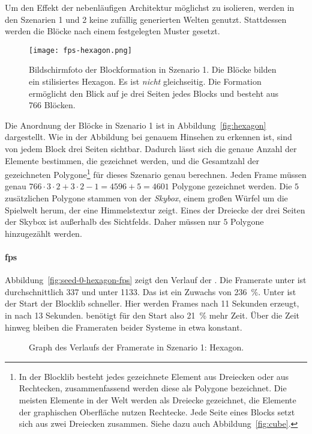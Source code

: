 
Um den Effekt der nebenläufigen Architektur möglichst zu isolieren, werden in den Szenarien 1 und 2 keine zufällig generierten Welten genutzt. Stattdessen werden die Blöcke nach einem festgelegten Muster gesetzt.

\begin{figure}
	\centering
	\texttt{[image: fps-hexagon.png]}
	\caption[Bildschirmfoto der Blockformation in Szenario 1 der Performanceanalyse.]{Bildschirmfoto der Blockformation in Szenario 1. Die Blöcke bilden ein stilisiertes Hexagon. Es ist \emph{nicht} gleichseitig. Die Formation ermöglicht den Blick auf je drei Seiten jedes Blocks und besteht aus 766 Blöcken.}\label{fig:hexagon}
\end{figure}
Die Anordnung der Blöcke in Szenario 1 ist in Abbildung~\vref{fig:hexagon} dargestellt. Wie in der Abbildung bei genauem Hinsehen zu erkennen ist, sind von jedem Block drei Seiten sichtbar. Dadurch lässt sich die genaue Anzahl der Elemente bestimmen, die gezeichnet werden, und die Gesamtzahl der gezeichneten Polygone\footnote{In der Blocklib besteht jedes gezeichnete Element aus Dreiecken oder aus Rechtecken, zusammenfassend werden diese als Polygone bezeichnet. Die meisten Elemente in der Welt werden als Dreiecke gezeichnet, die Elemente der graphischen Oberfläche nutzen Rechtecke. Jede Seite eines Blocks setzt sich aus zwei Dreiecken zusammen. Siehe dazu auch Abbildung~\vref{fig:cube}.} für dieses Szenario genau berechnen. Jeden Frame müssen genau $766\cdot3\cdot2 + 3\cdot2-1 = 4596 +5 = 4601$ Polygone gezeichnet werden. Die $5$ zusätzlichen Polygone stammen von der \emph{Skybox}, einem großen Würfel um die Spielwelt herum, der eine Himmelstextur zeigt. Eines der Dreiecke der drei Seiten der Skybox ist außerhalb des Sichtfelds. Daher müssen nur $5$ Polygone hinzugezählt werden.


\paragraph{\ac{fps}} Abbildung~\vref{fig:seed-0-hexagon-fps} zeigt den Verlauf der \si{\fps}. Die Framerate unter \sysA{} ist durchschnittlich \SI{337}{\fps} und unter \sysB{} \SI{1133}{\fps}. Das ist ein Zuwachs von \SI{236}{\percent}. Unter \sysA{} ist der Start der Blocklib schneller. Hier werden Frames nach 11 Sekunden erzeugt, in \sysB{} nach 13 Sekunden. \sysB{} benötigt für den Start also \SI{21}{\percent} mehr Zeit. Über die Zeit hinweg bleiben die Frameraten beider Systeme in etwa konstant.
\begin{figure}[!htbp]
	\settowidth{}
	\caption{Graph des Verlaufs der Framerate in Szenario 1: Hexagon.}\label{fig:seed-0-hexagon-fps}
\end{figure}


